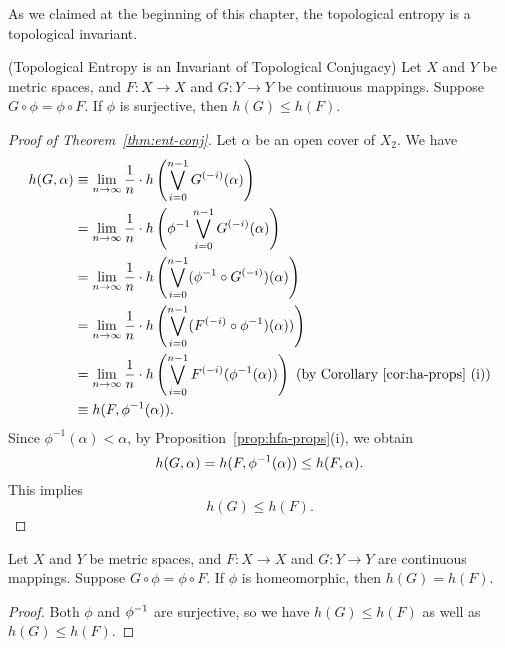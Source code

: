 \documentclass[10pt,twoside,draft]{book}
\begin{document}
As we claimed at the beginning of this chapter, the topological entropy is a topological invariant.
\begin{theorem}
  (Topological Entropy is an Invariant of Topological Conjugacy)
  Let $X$ and $Y$ be metric spaces, and $F: X \to X$ and $G: Y \to Y$ be continuous mappings.
  Suppose $G\circ \phi = \phi \circ F$.
  If $\phi$ is surjective, then $h(G) \leq h(F)$.
  \label{thm:ent-conj}
  \begin{proof}[Proof of Theorem~\ref{thm:ent-conj}]
    Let $\alpha$ be an open cover of $X_2$.
    We have
    \begin{align*}
      h(G, \alpha)
      &\equiv \lim\limits_{n \to \infty} \frac{1}{n} \cdot h \left ( \bigvee\limits_{i = 0}^{n-1} G^{(-i)}(\alpha) \right ) \\
      &= \lim\limits_{n \to \infty} \frac{1}{n} \cdot h \left ( \phi^{-1} \bigvee\limits_{i = 0}^{n-1} G^{(-i)} (\alpha) \right ) \\
      &= \lim\limits_{n \to \infty} \frac{1}{n} \cdot h \left ( \bigvee\limits_{i = 0}^{n-1} (\phi^{-1} \circ G^{(-i)}) (\alpha) \right ) \\
      &= \lim\limits_{n \to \infty} \frac{1}{n} \cdot h \left (  \bigvee\limits_{i = 0}^{n-1} (F^{(-i)} \circ \phi^{-1}) (\alpha)) \right ) \\
      &= \lim\limits_{n \to \infty} \frac{1}{n} \cdot h \left ( \bigvee\limits_{i = 0}^{n-1} F^{(-i)} (\phi^{-1} (\alpha)) \right ) \mbox{ (by Corollary~\ref{cor:ha-props} (i))} \\
      &\equiv h(F, \phi^{-1}(\alpha)).
    \end{align*}
    Since $\phi^{-1}(\alpha) < \alpha$, by Proposition~\ref{prop:hfa-props}(i), we obtain
    \begin{equation*}
      h(G,\alpha) 
      = h(F,\phi^{-1}(\alpha))
      \leq h(F, \alpha).
    \end{equation*}
    This implies
    \begin{equation*}
      h(G) \leq h(F).
    \end{equation*}
  \end{proof}
\end{theorem}
\begin{corollary}
  Let $X$ and $Y$ be metric spaces, and $F: X \to X$ and $G: Y \to Y$ are continuous mappings.
  Suppose $G\circ \phi = \phi \circ F$.
  If $\phi$ is homeomorphic, then $h(G) = h(F)$.
\begin{proof}
  Both $\phi$ and $\phi^{-1}$ are surjective, so we have $h(G) \leq h(F)$ as well as $h(G) \leq h(F)$.
\end{proof}
\end{corollary}
\end{document}
